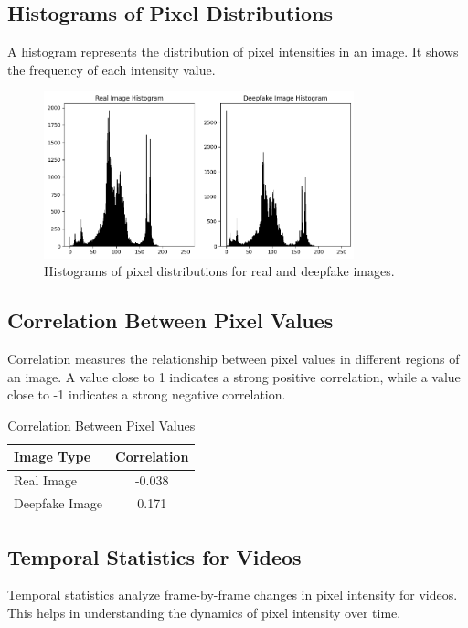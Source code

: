 \documentclass{article}
\begin{document}
\subsection{Histograms of Pixel Distributions}
A histogram represents the distribution of pixel intensities in an image. It shows the frequency of each intensity value.

\begin{figure}[h!]
    \centering
    \includegraphics[width=0.8\textwidth]{histograms.png}
    \caption{Histograms of pixel distributions for real and deepfake images.}
    \label{fig:histograms}
\end{figure}

\subsection{Correlation Between Pixel Values}
Correlation measures the relationship between pixel values in different regions of an image. A value close to 1 indicates a strong positive correlation, while a value close to -1 indicates a strong negative correlation.

\begin{table}[h!]
    \centering
    \begin{tabular}{lc}
        \toprule
        \textbf{Image Type} & \textbf{Correlation} \\
        \midrule
        Real Image & -0.038 \\
        Deepfake Image & 0.171 \\
        \bottomrule
    \end{tabular}
    \caption{Correlation Between Pixel Values}
    \label{tab:correlation}
\end{table}

\subsection{Temporal Statistics for Videos}
Temporal statistics analyze frame-by-frame changes in pixel intensity for videos. This helps in understanding the dynamics of pixel intensity over time.
\end{document}
